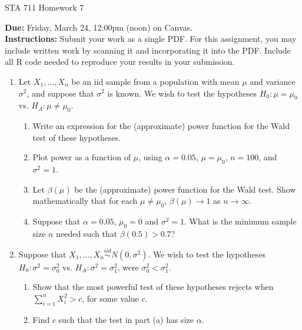 \documentclass[11pt]{article}
\begin{document}
\begin{center}
\Large
STA 711 Homework 7\\
\normalsize
\vspace{5mm}
\end{center}

\noindent \textbf{Due:} Friday, March 24, 12:00pm (noon) on Canvas.\\ 

\noindent \textbf{Instructions:} Submit your work as a single PDF. For this assignment, you may include written work by scanning it and incorporating it into the PDF. Include all R code needed to reproduce your results in your submission.


\begin{enumerate}
\item Let $X_1,...,X_n$ be an iid sample from a population with mean $\mu$ and variance $\sigma^2$, and suppose that $\sigma^2$ is known. We wish to test the hypotheses $H_0: \mu = \mu_0$ vs. $H_A: \mu \neq \mu_0$.

\begin{enumerate}
\item Write an expression for the (approximate) power function for the Wald test of these hypotheses.
\item Plot power as a function of $\mu$, using $\alpha = 0.05$, $\mu = \mu_0$, $n = 100$, and $\sigma^2 = 1$.
\item Let $\beta(\mu)$ be the (approximate) power function for the Wald test. Show mathematically that for each $\mu \neq \mu_0$, $\beta(\mu) \to 1$ as $n \to \infty$.
\item Suppose that $\alpha = 0.05$, $\mu_0 = 0$ and $\sigma^2 = 1$. What is the minimum sample size $n$ needed such that $\beta(0.5) > 0.7$?
\end{enumerate}

\item Suppose that $X_1,...,X_n \overset{iid}{\sim} N(0, \sigma^2)$. We wish to test the hypotheses $H_0: \sigma^2 = \sigma_0^2$ vs. $H_A: \sigma^2 = \sigma_1^2$, were $\sigma_0^2 < \sigma_1^2$.

\begin{enumerate}
\item Show that the most powerful test of these hypotheses rejects when $\sum \limits_{i=1}^n X_i^2 > c$, for some value $c$.
\item Find $c$ such that the test in part (a) has size $\alpha$.
\end{enumerate}


\end{enumerate}
\end{document}
